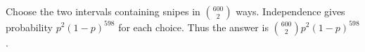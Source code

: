 Choose the two intervals containing snipes in $\binom{600}{2}$ ways. Independence gives probability $p^2(1-p)^{598}$ for each choice. Thus the answer is $\boxed{\binom{600}{2}p^2(1-p)^{598}}$.
